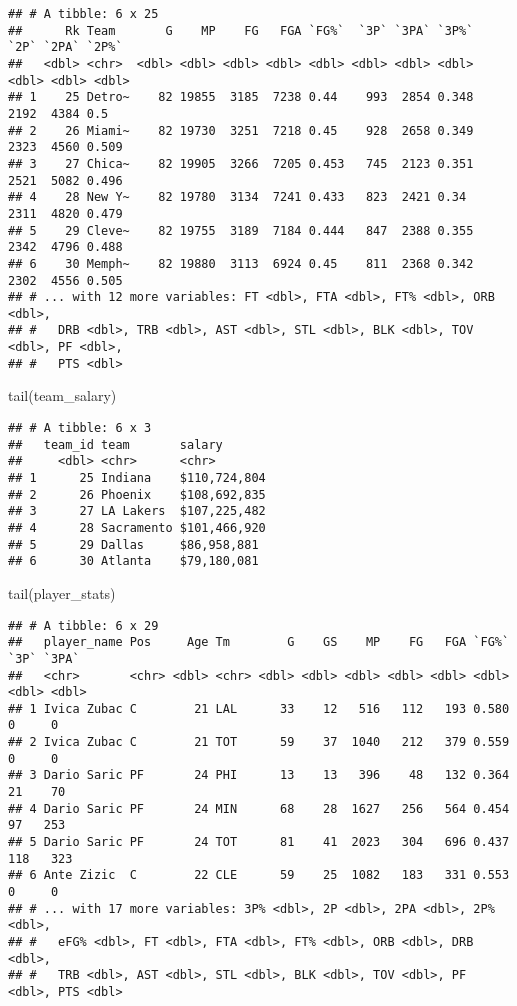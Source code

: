 \documentclass[
]{article}
\newenvironment{Shaded}{\begin{snugshade}}{\end{snugshade}}
\newcommand{\FunctionTok}[1]{\textcolor[rgb]{0.00,0.00,0.00}{#1}}
\newcommand{\NormalTok}[1]{#1}
\begin{document}
\begin{verbatim}
## # A tibble: 6 x 25
##      Rk Team       G    MP    FG   FGA `FG%`  `3P` `3PA` `3P%`  `2P` `2PA` `2P%`
##   <dbl> <chr>  <dbl> <dbl> <dbl> <dbl> <dbl> <dbl> <dbl> <dbl> <dbl> <dbl> <dbl>
## 1    25 Detro~    82 19855  3185  7238 0.44    993  2854 0.348  2192  4384 0.5  
## 2    26 Miami~    82 19730  3251  7218 0.45    928  2658 0.349  2323  4560 0.509
## 3    27 Chica~    82 19905  3266  7205 0.453   745  2123 0.351  2521  5082 0.496
## 4    28 New Y~    82 19780  3134  7241 0.433   823  2421 0.34   2311  4820 0.479
## 5    29 Cleve~    82 19755  3189  7184 0.444   847  2388 0.355  2342  4796 0.488
## 6    30 Memph~    82 19880  3113  6924 0.45    811  2368 0.342  2302  4556 0.505
## # ... with 12 more variables: FT <dbl>, FTA <dbl>, FT% <dbl>, ORB <dbl>,
## #   DRB <dbl>, TRB <dbl>, AST <dbl>, STL <dbl>, BLK <dbl>, TOV <dbl>, PF <dbl>,
## #   PTS <dbl>
\end{verbatim}

\begin{Shaded}
\begin{Highlighting}[]
\FunctionTok{tail}\NormalTok{(team\_salary)}
\end{Highlighting}
\end{Shaded}

\begin{verbatim}
## # A tibble: 6 x 3
##   team_id team       salary      
##     <dbl> <chr>      <chr>       
## 1      25 Indiana    $110,724,804
## 2      26 Phoenix    $108,692,835
## 3      27 LA Lakers  $107,225,482
## 4      28 Sacramento $101,466,920
## 5      29 Dallas     $86,958,881 
## 6      30 Atlanta    $79,180,081
\end{verbatim}

\begin{Shaded}
\begin{Highlighting}[]
\FunctionTok{tail}\NormalTok{(player\_stats)}
\end{Highlighting}
\end{Shaded}

\begin{verbatim}
## # A tibble: 6 x 29
##   player_name Pos     Age Tm        G    GS    MP    FG   FGA `FG%`  `3P` `3PA`
##   <chr>       <chr> <dbl> <chr> <dbl> <dbl> <dbl> <dbl> <dbl> <dbl> <dbl> <dbl>
## 1 Ivica Zubac C        21 LAL      33    12   516   112   193 0.580     0     0
## 2 Ivica Zubac C        21 TOT      59    37  1040   212   379 0.559     0     0
## 3 Dario Saric PF       24 PHI      13    13   396    48   132 0.364    21    70
## 4 Dario Saric PF       24 MIN      68    28  1627   256   564 0.454    97   253
## 5 Dario Saric PF       24 TOT      81    41  2023   304   696 0.437   118   323
## 6 Ante Zizic  C        22 CLE      59    25  1082   183   331 0.553     0     0
## # ... with 17 more variables: 3P% <dbl>, 2P <dbl>, 2PA <dbl>, 2P% <dbl>,
## #   eFG% <dbl>, FT <dbl>, FTA <dbl>, FT% <dbl>, ORB <dbl>, DRB <dbl>,
## #   TRB <dbl>, AST <dbl>, STL <dbl>, BLK <dbl>, TOV <dbl>, PF <dbl>, PTS <dbl>
\end{verbatim}
\end{document}
